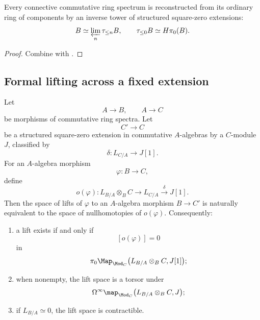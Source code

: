 \begin{corollary}
\label{cor:postnikov-infinitesimal-reconstruction}
Every connective commutative ring spectrum is reconstructed from its
ordinary ring of components by an inverse tower of structured square-zero
extensions:
\[
    B
    \simeq
    \varprojlim_n
    \tau_{\leq n}B,
    \qquad
    \tau_{\leq0}B
    \simeq
    H\pi_0(B).
\]
\end{corollary}

\begin{proof}
Combine  with
.
\end{proof}

\subsection{Formal lifting across a fixed extension}

\begin{proposition}
\label{prop:formal-lifting-square-zero}
Let
\[
    A
    \longrightarrow
    B,
    \qquad
    A
    \longrightarrow
    C
\]
be morphisms of commutative ring spectra. Let
\[
    C'
    \longrightarrow
    C
\]
be a structured square-zero extension in commutative $A$-algebras by a
$C$-module $J$, classified by
\[
    \delta
    \colon
    L_{C/A}
    \longrightarrow
    J[1].
\]
For an $A$-algebra morphism
\[
    \varphi
    \colon
    B
    \longrightarrow
    C,
\]
define
\[
    o(\varphi)
    \colon
    L_{B/A}\otimes_BC
    \longrightarrow
    L_{C/A}
    \xrightarrow{\delta}
    J[1].
\]
Then the space of lifts of $\varphi$ to an $A$-algebra morphism
$B\to C'$ is naturally equivalent to the space of nullhomotopies of
$o(\varphi)$. Consequently:
\begin{enumerate}[label=(\roman*)]
    \item a lift exists if and only if
    \[
        [o(\varphi)]
        =
        0
    \]
    in
    \[
        \pi_0
        \Map_{\Mod_C}
        \bigl(
            L_{B/A}\otimes_BC,
            J[1]
        \bigr);
    \]

    \item when nonempty, the lift space is a torsor under
    \[
        \Omega^\infty
        \map_{\Mod_C}
        \bigl(
            L_{B/A}\otimes_BC,
            J
        \bigr);
    \]

    \item if $L_{B/A}\simeq0$, the lift space is contractible.
\end{enumerate}
\end{proposition}

